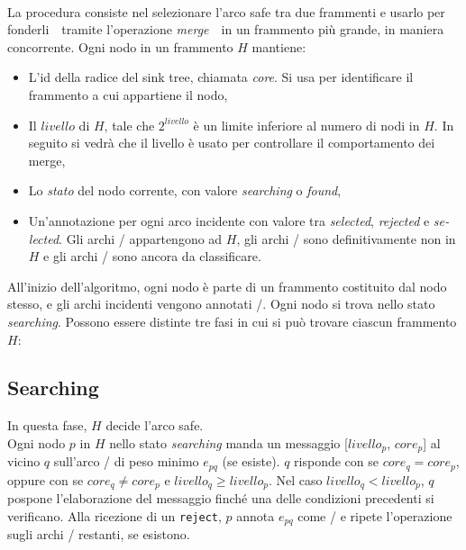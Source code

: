 \documentclass[target=bach,aauheader=,style=]{thud}
\newcommand{\eng}[1]{\foreignlanguage{english}{#1}}
\begin{document}
\paragraph{}
La procedura consiste nel selezionare l'arco \eng{safe} tra due frammenti e usarlo per fonderli \,\textendash\, tramite l'operazione \emph{\eng{merge}} \,\textendash\, in un frammento più grande, in maniera concorrente. Ogni nodo in un frammento $H$ mantiene:
\begin{itemize}
  \item L'id della radice del \eng{sink tree}, chiamata \emph{core}. Si usa per identificare il frammento a cui appartiene il nodo,
  \item Il $livello$ di $H$, tale che $2^{livello}$ è un limite inferiore al numero di nodi in $H$. In seguito si vedrà che il livello è usato per controllare il comportamento dei \eng{merge},
  \item Lo \emph{stato} del nodo corrente, con valore \emph{\eng{searching}} o \emph{\eng{found}},
  \item Un'annotazione per ogni arco incidente con valore tra \emph{\eng{selected}}, \emph{\eng{rejected}} e \emph{\eng{selected}}. Gli archi \selected/ appartengono ad $H$, gli archi \rejected/ sono definitivamente non in $H$ e gli archi \undecided/ sono ancora da classificare.
\end{itemize}
All'inizio dell'algoritmo, ogni nodo è parte di un frammento costituito dal nodo stesso, e gli archi incidenti vengono annotati \undecided/. Ogni nodo si trova nello stato \emph{\eng{searching}}. Possono essere distinte tre fasi in cui si può trovare ciascun frammento $H$:

\subsection{\eng{Searching}}
In questa fase, $H$ decide l'arco \eng{safe}.\\
Ogni nodo $p$ in $H$ nello stato \emph{\eng{searching}} manda un messaggio [$livello_p$, $core_p$] al vicino $q$ sull'arco \undecided/ di peso minimo $e_{pq}$ (se esiste). $q$ risponde con  se $core_q=core_p$, oppure con  se $core_q\ne core_p$ e $livello_q\geq livello_p$. Nel caso $livello_q<livello_p$, $q$ pospone l'elaborazione del messaggio finché una delle condizioni precedenti si verificano. Alla ricezione di un \lstinline{reject}, $p$ annota $e_{pq}$ come \rejected/ e ripete l'operazione sugli archi \undecided/ restanti, se esistono.
\end{document}
